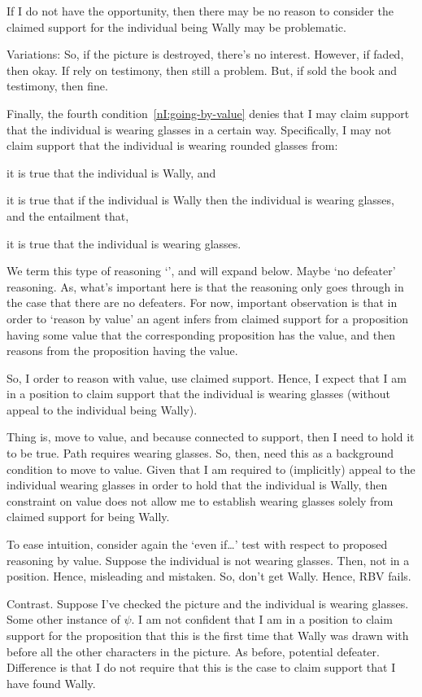 \begin{note}[Illustration]
{    If I do not have the opportunity, then there may be no reason to consider the claimed support for the individual being Wally may be problematic.

    Variations:
    So, if the picture is destroyed, there's no interest.
    However, if faded, then okay.
    If rely on testimony, then still a problem.
    But, if sold the book and testimony, then fine.
  }

  Finally, the fourth condition~\ref{nI:going-by-value} denies that I may claim support that the individual is wearing glasses in a certain way.
  Specifically, I may not claim support that the individual is wearing rounded glasses from:
  \begin{enumerate*}
  \item it is true that the individual is Wally, and
  \item it is true that if the individual is Wally then the individual is wearing glasses, and the entailment that,
  \item it is true that the individual is wearing glasses.
  \end{enumerate*}
  We term this type of reasoning `\RBV{-}', and will expand below.
  {
    \color{red} Maybe `no defeater' reasoning.
    As, what's important here is that the reasoning only goes through in the case that there are no defeaters.
  }
  For now, important observation is that in order to `reason by value' an agent infers from claimed support for a proposition having some value that the corresponding proposition has the value, and then reasons from the proposition having the value.

  So, I order to reason with value, use claimed support.
  Hence, I expect that I am in a position to claim support that the individual is wearing glasses (without appeal to the individual being Wally).

  Thing is, move to value, and because connected to support, then I need to hold it to be true.
  Path requires wearing glasses.
  So, then, need this as a background condition to move to value.
  Given that I am required to (implicitly) appeal to the individual wearing glasses in order to hold that the individual is Wally, then constraint on value does not allow me to establish wearing glasses solely from claimed support for being Wally.

  To ease intuition, consider again the `even if\dots' test with respect to proposed reasoning by value.
  Suppose the individual is not wearing glasses.
  Then, not in a position.
  Hence, misleading and mistaken.
  So, don't get Wally.
  Hence, RBV fails.

  Contrast.
  Suppose I've checked the picture and the individual is wearing glasses.
  Some other instance of \(\psi\).
  I am not confident that I am in a position to claim support for the proposition that this is the first time that Wally was drawn with before all the other characters in the picture.
  As before, potential defeater.
  Difference is that I do not require that this is the case to claim support that I have found Wally.
\end{note}

